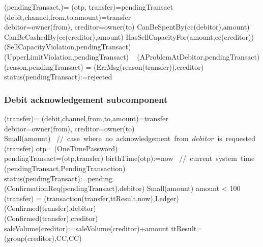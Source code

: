 \begin{asm}
(pendingTransact,)=\+
	\LET (otp, transfer)=pendingTransact\\
	\LET (debit,channel,from,to,amount)=transfer\\
	\LET debitor=owner(from), creditor=owner(to)\+
	\IF CanBeSpentBy(cc(debitor),amount) \THEN \+
		\IF CanBeCashedBy(cc(creditor),amount) \THEN \+
			\IF HasSellCapacityFor(amount,cc(creditor)) \THEN \+
				 \-
			\ELSE ~ (SellCapacityViolation,pendingTransact) \-
		\ELSE ~ (UpperLimitViolation,pendingTransact) \-
	\ELSE ~  (AProblemAtDebitor,pendingTransact) \dec\-
\WHERE \+
	(reason,pendingTransact)  =\+
	(ErrMsg(reason(transfer)),\TO creditor)\\
	status(pendingTransact):=rejected 
\end{asm}
 
 
 \subsubsection{Debit acknowledgement subcomponent}
 
 \begin{asm}
 	(transfer)=\+
 	\LET (debit,channel,from,to,amount)=transfer \\
 	\LET debitor=owner(from), creditor=owner(to)\\
 	\IF Small(amount) \THEN
 	\mbox{  // case where no acknowledgement from $debitor$ is requested}\+
		(transfer) \-
 	\ELSE \+
 	\LET otp= \NEW(OneTimePassword)\\
 	\LET pendingTransact=(otp,transfer)\+
 	birthTime(otp):=now \mbox{ // current system time}\\
 	(pendingTransact,PendingTransaction)\\ 
 	status(pendingTransact):=pending \\
 	(ConfirmationReq(pendingTransact),\TO debitor)
 	\dec\dec\-
 	\WHERE \+
 	Small(amount) \IFF amount < 100 \\
 	(transfer) =\+     
 	(transaction(transfer,ttResult,now),Ledger)\\
 	(Confirmed(transfer),\TO debitor)\\
 	(Confirmed(transfer),\TO creditor)\\
 	saleVolume(creditor):=saleVolume(creditor)+amount \-
 	ttResult=(group(creditor),CC,CC)
 \end{asm}

